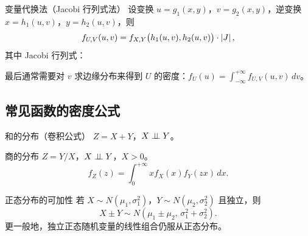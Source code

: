 \begin{myTheorem}{变量代换法（Jacobi 行列式法）}
设变换 $u = g_1(x, y)$，$v = g_2(x, y)$，逆变换 $x = h_1(u, v)$，$y = h_2(u, v)$，则
\[f_{U,V}(u, v) = f_{X,Y}\bigl(h_1(u, v), h_2(u, v)\bigr) \cdot \left|J\right|,\]
其中 Jacobi 行列式：
\begin{myformula}
\end{myformula}

最后通常需要对 $v$ 求边缘分布来得到 $U$ 的密度：$f_U(u) = \int_{-\infty}^{+\infty} f_{U,V}(u, v)\,dv$。
\end{myTheorem}

\subsection{常见函数的密度公式}

\begin{myTheorem}{和的分布（卷积公式）}
$Z = X + Y$，$X \perp\!\!\!\perp Y$。
\begin{myformula}
\end{myformula}
\end{myTheorem}

\begin{myTheorem}{商的分布}
$Z = Y / X$，$X \perp\!\!\!\perp Y$，$X > 0$。
\[f_Z(z) = \int_{0}^{+\infty} x f_X(x) f_Y(zx)\,dx.\]
\end{myTheorem}

\begin{myTheorem}{正态分布的可加性}
若 $X \sim N(\mu_1, \sigma_1^2)$，$Y \sim N(\mu_2, \sigma_2^2)$ 且独立，则
\[X \pm Y \sim N(\mu_1 \pm \mu_2,\, \sigma_1^2 + \sigma_2^2).\]
更一般地，独立正态随机变量的线性组合仍服从正态分布。
\end{myTheorem}
